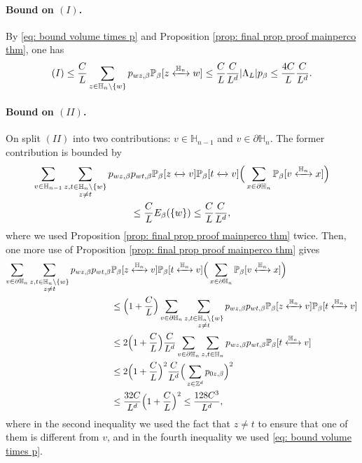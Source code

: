 \documentclass[11pt,a4paper]{article}
\numberwithin{equation}{section}
\theoremstyle{plain}
\theoremstyle{definition}
\newcommand{\connect}{\xleftrightarrow}
\begin{document}
\paragraph{Bound on $(I)$.} By \eqref{eq: bound volume times p} and Proposition \ref{prop: final prop proof mainperco thm}, one has
\begin{equation}
	(I)\leq \frac{C}{L}\sum_{z\in \mathbb H_n\setminus \{w\}}p_{wz,\beta}\mathbb P_\beta[z\connect{\mathbb H_n\:}w]\leq \frac{C}{L}\frac{C}{L^d}|\Lambda_L|p_\beta\leq \frac{4C}{L}\frac{C}{L^d}.
\end{equation}
\paragraph{Bound on $(II)$.} On split $(II)$ into two contributions: $v\in \mathbb H_{n-1}$ and $v\in \partial \mathbb H_n$. The former contribution is bounded by 
\begin{multline}
	\sum_{v\in \mathbb H_{n-1}}\sum_{\substack{z,t\in \mathbb H_n\setminus \{w\}\\z\neq t}}p_{wz,\beta}p_{wt,\beta}\mathbb P_\beta[z\connect{\:}v]\mathbb P_\beta[t\connect{\:}v]\Big(\sum_{x\in \partial \mathbb H_n}\mathbb P_\beta[v\connect{\mathbb H_n\:}x]\Big)\\\leq \frac{C}{L} E_\beta(\{w\})\leq \frac{C}{L}\frac{C}{L^d},
\end{multline}
where we used Proposition \ref{prop: final prop proof mainperco thm} twice.
Then, one more use of Proposition \ref{prop: final prop proof mainperco thm} gives
\begin{align*}
	\sum_{v\in \partial \mathbb H_n}\sum_{\substack{z,t\in \mathbb H_n\setminus \{w\}\\z\neq t}}p_{wz,\beta}p_{wt,\beta}&\mathbb P_\beta[z\connect{\mathbb H_n\:}v]\mathbb P_\beta[t\connect{\mathbb H_n\:}v]\Big(\sum_{x\in \partial\mathbb H_n}\mathbb P_\beta[v\connect{\mathbb H_n\:}x]\Big)
	\\ &\leq \Big(1+\frac{C}{L}\Big)
\sum_{v\in \partial \mathbb H_n}\sum_{\substack{z,t\in \mathbb H_n\setminus \{w\}\\z\neq t}}p_{wz,\beta}p_{wt,\beta}\mathbb P_\beta[z\connect{\mathbb H_n\:}v]\mathbb P_\beta[t\connect{\mathbb H_n\:}v]
	\\&\leq 2\Big(1+\frac{C}{L}\Big)\frac{C}{L^d}\sum_{v\in \partial \mathbb H_n}\sum_{z,t\in \mathbb H_n}p_{wz,\beta}p_{wt,\beta}\mathbb P_\beta[t\connect{\mathbb H_n\:}v]
	\\&\leq 2\Big(1+\frac{C}{L}\Big)^2\frac{C}{L^d}\Big(\sum_{z\in \mathbb Z^d}p_{0z,\beta}\Big)^2 
	\\&\leq\frac{32C}{L^{d}}\Big(1+\frac{C}{L}\Big)^2\leq \frac{128C^3}{L^d},
\end{align*}
where in the second inequality we used the fact that $z\neq t$ to ensure that one of them is different from $v$, and in the fourth inequality we used \eqref{eq: bound volume times p}.
\end{document}
